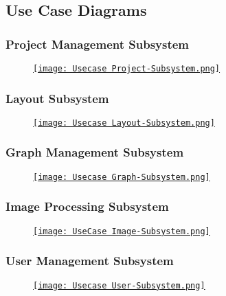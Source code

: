 \documentclass[11pt,a4paper]{article}
\begin{document}
\pagebreak

\subsection*{Use Case Diagrams}

\subsubsection*{Project Management Subsystem}
\begin{figure}[htbp]
    \centering
    \href{https://drive.google.com/drive/u/2/folders/18FJi5U-PEzTiB-SsYfPQOV304R0K7s3H}{\texttt{[image: Usecase Project-Subsystem.png]}}
\end{figure}

\pagebreak
\subsubsection*{Layout Subsystem}
\begin{figure}[htbp]
    \centering
     \href{https://drive.google.com/drive/u/2/folders/18FJi5U-PEzTiB-SsYfPQOV304R0K7s3H}{\texttt{[image: Usecase Layout-Subsystem.png]}}
\end{figure}

\subsubsection*{Graph Management Subsystem}
\begin{figure}[htbp]
    \centering
    \href{https://drive.google.com/drive/u/2/folders/18FJi5U-PEzTiB-SsYfPQOV304R0K7s3H}{\texttt{[image: Usecase Graph-Subsystem.png]}}
\end{figure}

\pagebreak
\subsubsection*{Image Processing Subsystem}
\begin{figure}[htbp]
    \centering
    \href{https://drive.google.com/drive/u/2/folders/18FJi5U-PEzTiB-SsYfPQOV304R0K7s3H}{\texttt{[image: UseCase Image-Subsystem.png]}}
\end{figure}

\subsubsection*{User Management Subsystem}
\begin{figure}[htbp]
    \centering
    \href{https://drive.google.com/drive/u/2/folders/18FJi5U-PEzTiB-SsYfPQOV304R0K7s3H}{\texttt{[image: Usecase User-Subsystem.png]}}
\end{figure}
\end{document}
